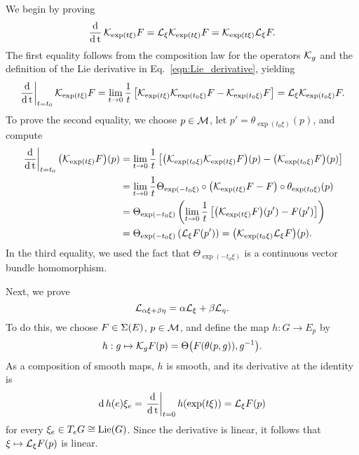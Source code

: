\documentclass[twoside,11pt]{article}
\begin{document}
    We begin by proving
    \begin{equation}
        \operatorname{\frac{\operatorname{\mathrm{d}}}{\operatorname{\mathrm{d}} t}} {\mathcal{K}}_{\exp(t\xi)}F 
        = {\mathcal{L}}_{\xi} {\mathcal{K}}_{\exp(t\xi)} F
        = {\mathcal{K}}_{\exp(t\xi)} {\mathcal{L}}_{\xi} F.
        \label{eqn:Lie_derivative_as_generator_proof_version}
    \end{equation}
    The first equality follows from the composition law for the operators ${\mathcal{K}}_g$ and the definition of the Lie derivative in Eq.~\ref{eqn:Lie_derivative}, yielding
    \begin{equation}
            \left.\operatorname{\frac{\operatorname{\mathrm{d}}}{\operatorname{\mathrm{d}} t}}\right\vert_{t=t_0} {\mathcal{K}}_{\exp(t\xi)}F
            = \lim_{t\to 0} \frac{1}{t}\left[ {\mathcal{K}}_{\exp(t\xi)}{\mathcal{K}}_{\exp(t_0\xi)}F - {\mathcal{K}}_{\exp(t_0\xi)}F \right]
            = {\mathcal{L}}_{\xi} {\mathcal{K}}_{\exp(t_0\xi)} F.
    \end{equation}
    To prove the second equality, we choose $p\in{\mathcal{M}}$, let $p' = \theta_{\exp(t_0\xi)}(p)$, and compute
    \begin{equation}
        \begin{aligned}
            \left.\operatorname{\frac{\operatorname{\mathrm{d}}}{\operatorname{\mathrm{d}} t}}\right\vert_{t=t_0} \big({\mathcal{K}}_{\exp(t\xi)}F\big)(p)
            &= \lim_{t\to 0} \frac{1}{t}\left[ \big({\mathcal{K}}_{\exp(t_0\xi)}{\mathcal{K}}_{\exp(t\xi)}F\big)(p) - \big({\mathcal{K}}_{\exp(t_0\xi)}F\big)(p) \right] \\
            &= \lim_{t\to 0} \frac{1}{t} \Theta_{\exp(-t_0\xi)} \circ \left( {\mathcal{K}}_{\exp(t\xi)} F - F \right) \circ \theta_{\exp(t_0\xi)}(p) \\
            &= \Theta_{\exp(-t_0\xi)}\left( \lim_{t\to 0} \frac{1}{t}\left[ \big({\mathcal{K}}_{\exp(t\xi)} F\big)(p') - F(p') \right] \right) \\
            &= \Theta_{\exp(-t_0\xi)}\left( {\mathcal{L}}_{\xi}F (p') \right)
            = \big({\mathcal{K}}_{\exp(t_0\xi)} {\mathcal{L}}_{\xi} F\big)(p).
        \end{aligned}
    \end{equation}
    In the third equality, we used the fact that $\Theta_{\exp(-t_0\xi)}$ is a continuous vector bundle homomorphism.

    Next, we prove
    \begin{equation}
        {\mathcal{L}}_{\alpha\xi + \beta \eta} = \alpha {\mathcal{L}}_{\xi} + \beta {\mathcal{L}}_{\eta}.
        \label{eqn:linearity_of_Lie_derivative_wrt_Lie_algebra_proof_version}
    \end{equation}
    To do this, we choose $F\in\operatorname{\Sigma}(E)$, $p\in{\mathcal{M}}$, and define the map $h: G \to E_p$ by
    \begin{equation}
        h: g \mapsto {\mathcal{K}}_g F(p) = \Theta\big( F(\theta(p,g)), g^{-1} \big).
        \label{eqn:pointwise_orbit_transformation}
    \end{equation}
    As a composition of smooth maps, $h$ is smooth, and its derivative at the identity is
    \begin{equation}
        \operatorname{\mathrm{d}} h(e) \xi_e = \left.\operatorname{\frac{\operatorname{\mathrm{d}}}{\operatorname{\mathrm{d}} t}}\right\vert_{t=0} h(\exp(t\xi)) = {\mathcal{L}}_{\xi} F(p)
        \label{eqn:pointwise_orbit_transformation_tangent_map}
    \end{equation}
    for every $\xi_e \in T_e G  \cong \operatorname{Lie}(G)$.
    Since the derivative is linear, it follows that $\xi \mapsto {\mathcal{L}}_{\xi} F(p)$ is linear.
\end{document}
